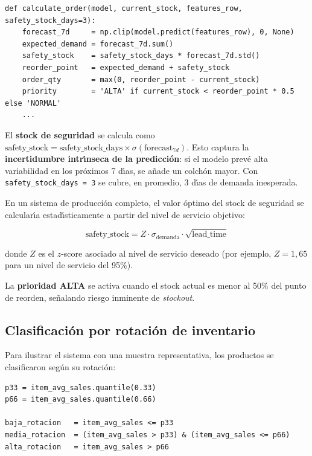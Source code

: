 \documentclass[12pt, a4paper, oneside]{report}
\newcommand{\code}[1]{\texttt{\small\color{codeblue}#1}}
\begin{document}
\begin{lstlisting}[caption={Funci\'on calculate\_order()}, label={lst:calc_order}]
def calculate_order(model, current_stock, features_row, safety_stock_days=3):
    forecast_7d     = np.clip(model.predict(features_row), 0, None)
    expected_demand = forecast_7d.sum()
    safety_stock    = safety_stock_days * forecast_7d.std()
    reorder_point   = expected_demand + safety_stock
    order_qty       = max(0, reorder_point - current_stock)
    priority        = 'ALTA' if current_stock < reorder_point * 0.5 else 'NORMAL'
    ...
\end{lstlisting}

El \textbf{stock de seguridad} se calcula como $\text{safety\_stock} = \text{safety\_stock\_days} \times \sigma(\text{forecast}_{7d})$. Esto captura la \textbf{incertidumbre intr\'{\i}nseca de la predicci\'on}: si el modelo prev\'e alta variabilidad en los pr\'oximos 7 d\'{\i}as, se a\~nade un colch\'on mayor. Con \code{safety\_stock\_days = 3} se cubre, en promedio, 3 d\'{\i}as de demanda inesperada.

En un sistema de producci\'on completo, el valor \'optimo del stock de seguridad se calcular\'{\i}a estad\'{\i}sticamente a partir del nivel de servicio objetivo:

\begin{equation}
  \text{safety\_stock} = Z \cdot \sigma_{\text{demanda}} \cdot \sqrt{\text{lead\_time}}
  \label{eq:safety_stock}
\end{equation}

donde $Z$ es el $z$-score asociado al nivel de servicio deseado (por ejemplo, $Z = 1{,}65$ para un nivel de servicio del 95\%).

La \textbf{prioridad ALTA} se activa cuando el stock actual es menor al 50\% del punto de reorden, se\~nalando riesgo inminente de \textit{stockout}.

\subsection{Clasificaci\'on por rotaci\'on de inventario}

Para ilustrar el sistema con una muestra representativa, los productos se clasificaron seg\'un su rotaci\'on:

\begin{lstlisting}[caption={Clasificaci\'on por rotaci\'on de inventario}, label={lst:rotacion}]
p33 = item_avg_sales.quantile(0.33)
p66 = item_avg_sales.quantile(0.66)

baja_rotacion   = item_avg_sales <= p33
media_rotacion  = (item_avg_sales > p33) & (item_avg_sales <= p66)
alta_rotacion   = item_avg_sales > p66
\end{lstlisting}
\end{document}
